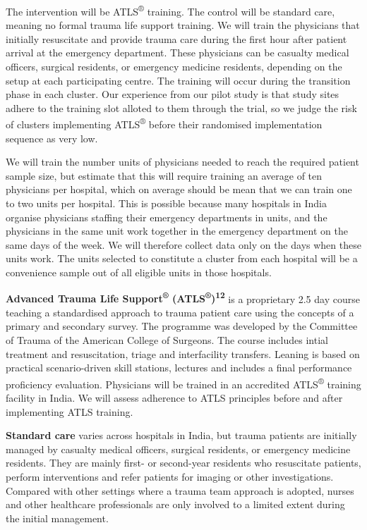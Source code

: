 \documentclass[
]{scrartcl}
\begin{document}
The intervention will be ATLS\textsuperscript{®} training. The control
will be standard care, meaning no formal trauma life support training.
We will train the physicians that initially resuscitate and provide
trauma care during the first hour after patient arrival at the emergency
department. These physicians can be casualty medical officers, surgical
residents, or emergency medicine residents, depending on the setup at
each participating centre. The training will occur during the transition
phase in each cluster. Our experience from our pilot study is that study
sites adhere to the training slot alloted to them through the trial, so
we judge the risk of clusters implementing ATLS\textsuperscript{®}
before their randomised implementation sequence as very low.

We will train the number units of physicians needed to reach the
required patient sample size, but estimate that this will require
training an average of ten physicians per hospital, which on average
should be mean that we can train one to two units per hospital. This is
possible because many hospitals in India organise physicians staffing
their emergency departments in units, and the physicians in the same
unit work together in the emergency department on the same days of the
week. We will therefore collect data only on the days when these units
work. The units selected to constitute a cluster from each hospital will
be a convenience sample out of all eligible units in those hospitals.

\textbf{Advanced Trauma Life Support\textsuperscript{®}
(ATLS\textsuperscript{®})\textsuperscript{12}} is a proprietary 2.5 day
course teaching a standardised approach to trauma patient care using the
concepts of a primary and secondary survey. The programme was developed
by the Committee of Trauma of the American College of Surgeons. The
course includes intial treatment and resuscitation, triage and
interfacility transfers. Leaning is based on practical scenario-driven
skill stations, lectures and includes a final performance proficiency
evaluation. Physicians will be trained in an accredited
ATLS\textsuperscript{®} training facility in India. We will assess
adherence to ATLS principles before and after implementing ATLS
training.

\textbf{Standard care} varies across hospitals in India, but trauma
patients are initially managed by casualty medical officers, surgical
residents, or emergency medicine residents. They are mainly first- or
second-year residents who resuscitate patients, perform interventions
and refer patients for imaging or other investigations. Compared with
other settings where a trauma team approach is adopted, nurses and other
healthcare professionals are only involved to a limited extent during
the initial management.
\end{document}
